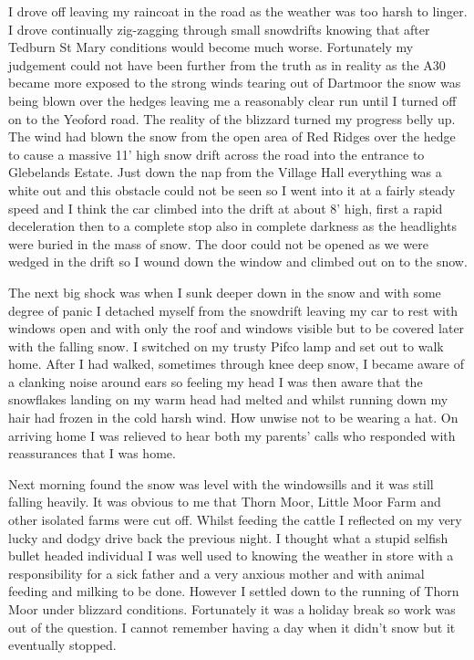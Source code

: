 I drove off leaving my raincoat in the road as the weather was too harsh to
linger. I drove continually zig-zagging through small snowdrifts knowing that
after Tedburn St Mary conditions would become much worse. Fortunately my
judgement could not have been further from the truth as in reality as the A30
became more exposed to the strong winds tearing out of Dartmoor the snow was
being blown over the hedges leaving me a reasonably clear run until I turned
off on to the Yeoford road. The reality of the blizzard turned my progress
belly up. The wind had blown the snow from the open area of Red Ridges over
the hedge to cause a massive 11' high snow drift across the road into the
entrance to Glebelands Estate. Just down the nap from the Village Hall
everything was a white out and this obstacle could not be seen so I went into
it at a fairly steady speed and I think the car climbed into the drift at about
8' high, first a rapid deceleration then to a complete stop also in complete
darkness as the headlights were buried in the mass of snow. The door could not
be opened as we were wedged in the drift so I wound down the window and climbed
out on to the snow.

The next big shock was when I sunk deeper down in the snow and with some degree
of panic I detached myself from the snowdrift leaving my car to rest with
windows open and with only the roof and windows visible but to be covered later
with the falling snow. I switched on my trusty Pifco lamp and set out to walk
home. After I had walked, sometimes through knee deep snow, I became aware of
a clanking noise around ears so feeling my head I was then aware that the
snowflakes landing on my warm head had melted and whilst running down my hair
had frozen in the cold harsh wind. How unwise not to be wearing a hat. On
arriving home I was relieved to hear both my parents' calls who responded with
reassurances that I was home.

Next morning found the snow was level with the windowsills and it was still
falling heavily. It was obvious to me that Thorn Moor, Little Moor Farm and
other isolated farms were cut off. Whilst feeding the cattle I reflected on my
very lucky and dodgy drive back the previous night. I thought what a stupid
selfish bullet headed individual I was well used to knowing the weather in
store with a responsibility for a sick father and a very anxious mother and
with animal feeding and milking to be done. However I settled down to the
running of Thorn Moor under blizzard conditions. Fortunately it was a holiday
break so work was out of the question. I cannot remember having a day when it
didn't snow but it eventually stopped.

